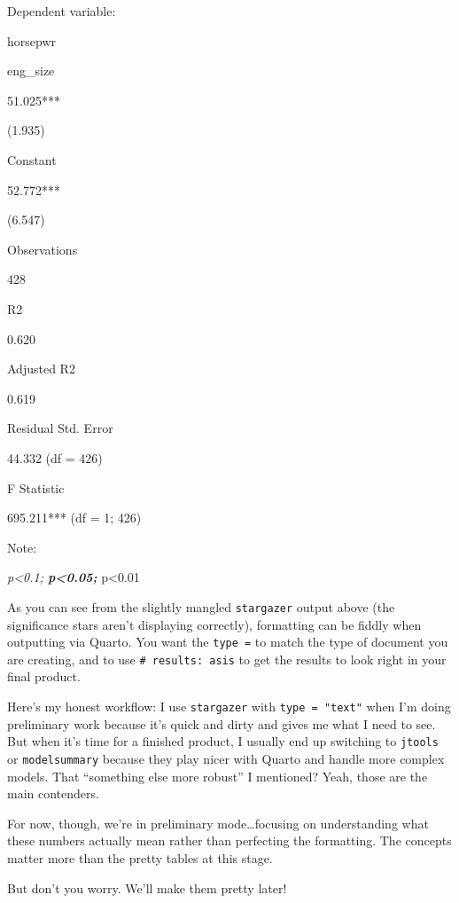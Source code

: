 \documentclass[
  letterpaper,
]{book}
\begin{document}
Dependent variable:

horsepwr

eng\_size

51.025***

(1.935)

Constant

52.772***

(6.547)

Observations

428

R2

0.620

Adjusted R2

0.619

Residual Std. Error

44.332 (df = 426)

F Statistic

695.211*** (df = 1; 426)

Note:

\emph{p\textless0.1; \textbf{p\textless0.05; }}p\textless0.01

\begin{tcolorbox}[enhanced jigsaw, colframe=quarto-callout-tip-color-frame, breakable, arc=.35mm, bottomtitle=1mm, bottomrule=.15mm, colbacktitle=quarto-callout-tip-color!10!white, rightrule=.15mm, colback=white, opacityback=0, opacitybacktitle=0.6, coltitle=black, left=2mm, toptitle=1mm, toprule=.15mm, titlerule=0mm, leftrule=.75mm, title=\textcolor{quarto-callout-tip-color}{\faLightbulb}\hspace{0.5em}{May the Format Be With You: Stargazer Formatting May Be Easy, But It's
Still Annoying}]

As you can see from the slightly mangled \texttt{stargazer} output above
(the significance stars aren't displaying correctly), formatting can be
fiddly when outputting via Quarto. You want the \texttt{type\ =} to
match the type of document you are creating, and to use
\texttt{\#\textbar{}\ results:\ asis} to get the results to look right
in your final product.

Here's my honest workflow: I use \texttt{stargazer} with
\texttt{type\ =\ "text"} when I'm doing preliminary work because it's
quick and dirty and gives me what I need to see. But when it's time for
a finished product, I usually end up switching to \texttt{jtools} or
\texttt{modelsummary} because they play nicer with Quarto and handle
more complex models. That ``something else more robust'' I mentioned?
Yeah, those are the main contenders.

For now, though, we're in preliminary mode\ldots focusing on
understanding what these numbers actually mean rather than perfecting
the formatting. The concepts matter more than the pretty tables at this
stage.

But don't you worry. We'll make them pretty later!

\end{tcolorbox}
\end{document}
